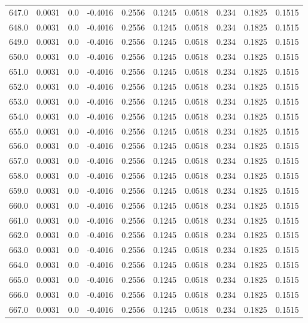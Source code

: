 \begin{longtable}{lrrrrrrrrr}
647.0 & 0.0031 & 0.0 & -0.4016 & 0.2556 & 0.1245 & 0.0518 & 0.234 & 0.1825 & 0.1515 \\
648.0 & 0.0031 & 0.0 & -0.4016 & 0.2556 & 0.1245 & 0.0518 & 0.234 & 0.1825 & 0.1515 \\
649.0 & 0.0031 & 0.0 & -0.4016 & 0.2556 & 0.1245 & 0.0518 & 0.234 & 0.1825 & 0.1515 \\
650.0 & 0.0031 & 0.0 & -0.4016 & 0.2556 & 0.1245 & 0.0518 & 0.234 & 0.1825 & 0.1515 \\
651.0 & 0.0031 & 0.0 & -0.4016 & 0.2556 & 0.1245 & 0.0518 & 0.234 & 0.1825 & 0.1515 \\
652.0 & 0.0031 & 0.0 & -0.4016 & 0.2556 & 0.1245 & 0.0518 & 0.234 & 0.1825 & 0.1515 \\
653.0 & 0.0031 & 0.0 & -0.4016 & 0.2556 & 0.1245 & 0.0518 & 0.234 & 0.1825 & 0.1515 \\
654.0 & 0.0031 & 0.0 & -0.4016 & 0.2556 & 0.1245 & 0.0518 & 0.234 & 0.1825 & 0.1515 \\
655.0 & 0.0031 & 0.0 & -0.4016 & 0.2556 & 0.1245 & 0.0518 & 0.234 & 0.1825 & 0.1515 \\
656.0 & 0.0031 & 0.0 & -0.4016 & 0.2556 & 0.1245 & 0.0518 & 0.234 & 0.1825 & 0.1515 \\
657.0 & 0.0031 & 0.0 & -0.4016 & 0.2556 & 0.1245 & 0.0518 & 0.234 & 0.1825 & 0.1515 \\
658.0 & 0.0031 & 0.0 & -0.4016 & 0.2556 & 0.1245 & 0.0518 & 0.234 & 0.1825 & 0.1515 \\
659.0 & 0.0031 & 0.0 & -0.4016 & 0.2556 & 0.1245 & 0.0518 & 0.234 & 0.1825 & 0.1515 \\
660.0 & 0.0031 & 0.0 & -0.4016 & 0.2556 & 0.1245 & 0.0518 & 0.234 & 0.1825 & 0.1515 \\
661.0 & 0.0031 & 0.0 & -0.4016 & 0.2556 & 0.1245 & 0.0518 & 0.234 & 0.1825 & 0.1515 \\
662.0 & 0.0031 & 0.0 & -0.4016 & 0.2556 & 0.1245 & 0.0518 & 0.234 & 0.1825 & 0.1515 \\
663.0 & 0.0031 & 0.0 & -0.4016 & 0.2556 & 0.1245 & 0.0518 & 0.234 & 0.1825 & 0.1515 \\
664.0 & 0.0031 & 0.0 & -0.4016 & 0.2556 & 0.1245 & 0.0518 & 0.234 & 0.1825 & 0.1515 \\
665.0 & 0.0031 & 0.0 & -0.4016 & 0.2556 & 0.1245 & 0.0518 & 0.234 & 0.1825 & 0.1515 \\
666.0 & 0.0031 & 0.0 & -0.4016 & 0.2556 & 0.1245 & 0.0518 & 0.234 & 0.1825 & 0.1515 \\
667.0 & 0.0031 & 0.0 & -0.4016 & 0.2556 & 0.1245 & 0.0518 & 0.234 & 0.1825 & 0.1515 \\

\end{longtable}
